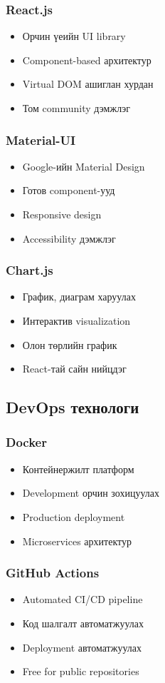 \documentclass[main.tex]{subfiles}
\begin{document}
\subsubsection{React.js}
\begin{itemize}
    \item Орчин үеийн UI library
    \item Component-based архитектур
    \item Virtual DOM ашиглан хурдан
    \item Том community дэмжлэг
\end{itemize}

\subsubsection{Material-UI}
\begin{itemize}
    \item Google-ийн Material Design
    \item Готов component-ууд
    \item Responsive design
    \item Accessibility дэмжлэг
\end{itemize}

\subsubsection{Chart.js}
\begin{itemize}
    \item График, диаграм харуулах
    \item Интерактив visualization
    \item Олон төрлийн график
    \item React-тай сайн нийцдэг
\end{itemize}

\subsection{DevOps технологи}

\subsubsection{Docker}
\begin{itemize}
    \item Контейнержилт платформ
    \item Development орчин зохицуулах
    \item Production deployment
    \item Microservices архитектур
\end{itemize}

\subsubsection{GitHub Actions}
\begin{itemize}
    \item Automated CI/CD pipeline
    \item Код шалгалт автоматжуулах
    \item Deployment автоматжуулах
    \item Free for public repositories
\end{itemize}
\end{document}
